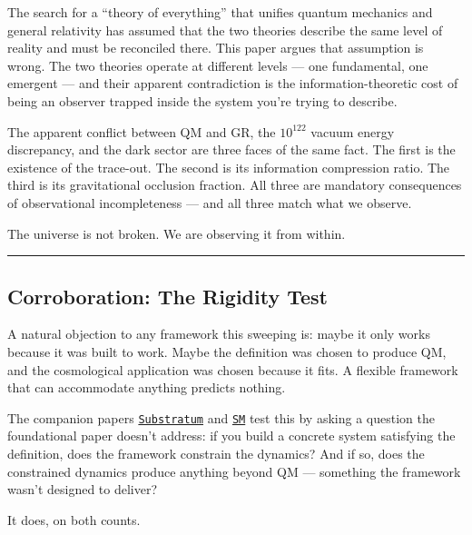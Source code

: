 \documentclass[
]{article}
\begin{document}
The search for a ``theory of everything'' that unifies quantum mechanics
and general relativity has assumed that the two theories describe the
same level of reality and must be reconciled there. This paper argues
that assumption is wrong. The two theories operate at different levels
--- one fundamental, one emergent --- and their apparent contradiction
is the information-theoretic cost of being an observer trapped inside
the system you're trying to describe.

The apparent conflict between QM and GR, the \(10^{122}\) vacuum energy
discrepancy, and the dark sector are three faces of the same fact. The
first is the existence of the trace-out. The second is its information
compression ratio. The third is its gravitational occlusion fraction.
All three are mandatory consequences of observational incompleteness ---
and all three match what we observe.

The universe is not broken. We are observing it from within.

\begin{center}\rule{0.5\linewidth}{0.5pt}\end{center}

\hypertarget{corroboration-the-rigidity-test}{%
\subsection{Corroboration: The Rigidity
Test}\label{corroboration-the-rigidity-test}}

A natural objection to any framework this sweeping is: maybe it only
works because it was built to work. Maybe the definition was chosen to
produce QM, and the cosmological application was chosen because it fits.
A flexible framework that can accommodate anything predicts nothing.

The companion papers \href{Substratum.md}{\texttt{Substratum}} and
\href{SM.md}{\texttt{SM}} test this by asking a question the
foundational paper doesn't address: if you build a concrete system
satisfying the definition, does the framework constrain the dynamics?
And if so, does the constrained dynamics produce anything beyond QM ---
something the framework wasn't designed to deliver?

It does, on both counts.
\end{document}

